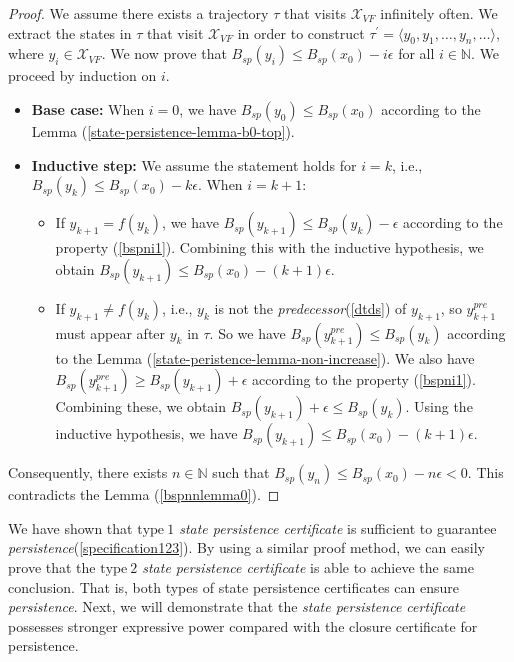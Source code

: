 \documentclass[acmlarge]{acmart}
\begin{document}
\begin{proof}
We assume there exists a trajectory $\tau$ that visits $\mathcal{X}_{VF}$ infinitely often. We extract the states in $\tau$ that visit $\mathcal{X}_{VF}$ in order to construct $\tau^{\prime} = \langle y_0, y_1, \dots, y_n, \dots \rangle$, where $y_i \in \mathcal{X}_{VF}$. We now prove that $B_{sp}(y_i) \leq B_{sp}(x_0) - i\epsilon$ for all $i \in \mathbb{N}$. 
We proceed by induction on $i$.
\begin{itemize}
    \item \textbf{Base case:} When $i = 0$, we have $B_{sp}(y_0) \leq B_{sp}(x_0)$ according to the Lemma (\ref{state-persistence-lemma-b0-top}).
    \item \textbf{Inductive step:} We assume the statement holds for $i = k$, i.e., $B_{sp}(y_k) \leq B_{sp}(x_0) - k\epsilon$. When $i = k + 1$:
    \begin{itemize}
        \item If $y_{k+1} = f(y_k)$, we have $B_{sp}(y_{k+1}) \leq B_{sp}(y_k) - \epsilon$ according to the property (\ref{bspni1}). Combining this with the inductive hypothesis, we obtain $B_{sp}(y_{k+1}) \leq B_{sp}(x_0) - (k + 1)\epsilon$.
        \item If $y_{k+1} \neq  f(y_k)$, i.e., $y_k$ is not the \emph{predecessor}(\ref{dtds}) of $y_{k+1}$, so $y_{k+1}^{pre}$ must appear after $y_k$ in $\tau$. 
        So we have $B_{sp}(y_{k+1}^{pre}) \leq B_{sp}(y_k)$ according to the Lemma (\ref{state-peristence-lemma-non-increase}). 
        We also have $B_{sp}(y_{k+1}^{pre}) \geq  B_{sp}(y_{k+1}) + \epsilon$ according to the property (\ref{bspni1}). 
        Combining these, we obtain $B_{sp}(y_{k+1}) + \epsilon \leq B_{sp}(y_k)$. 
        Using the inductive hypothesis, we have $B_{sp}(y_{k+1}) \leq B_{sp}(x_0) - (k + 1)\epsilon$.
    \end{itemize}
\end{itemize}
Consequently, there exists $n \in \mathbb{N}$ such that $B_{sp}(y_n) \leq B_{sp}(x_0) - n\epsilon < 0$. This contradicts the Lemma (\ref{bspnnlemma0}).
\end{proof}

We have shown that \emph{$\mathrm{type~1}$ state persistence certificate} is sufficient to guarantee \emph{persistence}(\ref{specification123}). By using a similar proof method, we can easily prove that the \emph{$\mathrm{type~2}$ state persistence certificate} is able to achieve the same conclusion. That is, both types of state persistence certificates can ensure \emph{persistence}. Next, we will demonstrate that the \emph{state persistence certificate} possesses stronger expressive power compared with the closure certificate for persistence.
\end{document}
